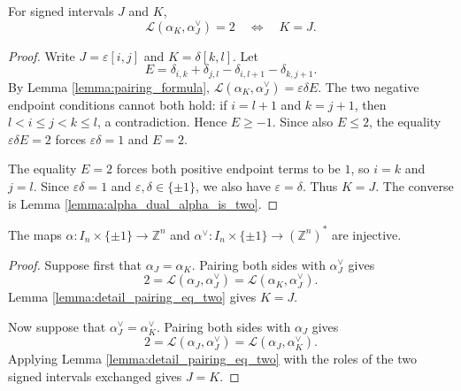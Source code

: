\begin{lemma}\label{lemma:detail_pairing_eq_two}
\leanok
For signed intervals $J$ and $K$,
\[
    \mathcal{L}(\alpha_K,\alpha_J^\vee)=2
    \quad\Longleftrightarrow\quad
    K=J.
\]
\end{lemma}
\begin{proof}
    \leanok
Write $J=\varepsilon[i,j]$ and $K=\delta[k,l]$. Let
\[
    E=
    \delta_{i,k}
    +\delta_{j,l}
    -\delta_{i,l+1}
    -\delta_{k,j+1}.
\]
By Lemma \ref{lemma:pairing_formula},
$\mathcal{L}(\alpha_K,\alpha_J^\vee)=\varepsilon\delta E$.
The two negative endpoint conditions cannot both hold: if
$i=l+1$ and $k=j+1$, then $l<i\le j<k\le l$, a contradiction. Hence
$E\ge -1$. Since also $E\le2$, the equality $\varepsilon\delta E=2$
forces $\varepsilon\delta=1$ and $E=2$.

The equality $E=2$ forces both positive endpoint terms to be $1$, so
$i=k$ and $j=l$. Since $\varepsilon\delta=1$ and
$\varepsilon,\delta\in\{\pm1\}$, we also have $\varepsilon=\delta$.
Thus $K=J$. The converse is Lemma \ref{lemma:alpha_dual_alpha_is_two}.
\end{proof}

\begin{lemma}\label{lemma:alpha_and_alpha_dual_injective}
\leanok
The maps
$\alpha:I_n\times\{\pm1\}\to\mathbb{Z}^n$ and
$\alpha^\vee:I_n\times\{\pm1\}\to(\mathbb{Z}^n)^*$ are injective.
\end{lemma}
\begin{proof}
    \leanok
Suppose first that $\alpha_J=\alpha_K$. Pairing both sides with
$\alpha_J^\vee$ gives
\[
    2=\mathcal{L}(\alpha_J,\alpha_J^\vee)
    =\mathcal{L}(\alpha_K,\alpha_J^\vee).
\]
Lemma \ref{lemma:detail_pairing_eq_two} gives $K=J$.

Now suppose that $\alpha_J^\vee=\alpha_K^\vee$. Pairing both sides with
$\alpha_J$ gives
\[
    2=\mathcal{L}(\alpha_J,\alpha_J^\vee)
    =\mathcal{L}(\alpha_J,\alpha_K^\vee).
\]
Applying Lemma \ref{lemma:detail_pairing_eq_two} with the roles of the
two signed intervals exchanged gives $J=K$.
\end{proof}

